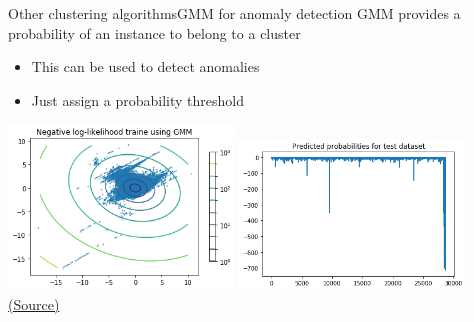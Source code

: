 \documentclass[10pt,compress]{beamer} %
\begin{document}
\begin{frame}{Other clustering algorithms}{GMM for anomaly detection}
    GMM provides a probability of an instance to belong to a cluster
    \begin{itemize}
         \item This can be used to detect anomalies
         \item Just assign a probability threshold
    \end{itemize} 
    
    \bigskip

    \centering
	\includegraphics[width=0.45\textwidth]{figs/gmm-anomaly.png}
	\includegraphics[width=0.45\textwidth]{figs/gmm-anomaly2.png}\\
	\scriptsize\href{https://www.kaggle.com/code/albertmistu/detect-anomalies-using-gmm}{(Source)}
\end{frame}
\end{document}
